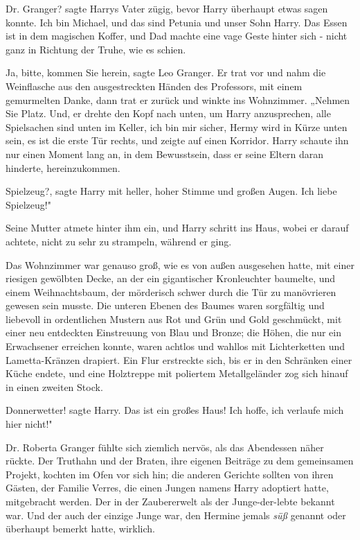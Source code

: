 \glqq Dr. Granger?\grqq{} sagte Harrys Vater zügig, bevor Harry überhaupt etwas
sagen konnte. \glqq Ich bin Michael, und das sind Petunia und unser Sohn Harry.
Das Essen ist in dem magischen Koffer\grqq{}, und Dad machte eine vage Geste
hinter sich - nicht ganz in Richtung der Truhe, wie es schien.

\glqq Ja, bitte, kommen Sie herein\grqq{}, sagte Leo Granger. Er trat vor und
nahm die Weinflasche aus den ausgestreckten Händen des Professors, mit einem
gemurmelten \glqq Danke\grqq{}, dann trat er zurück und winkte ins Wohnzimmer.
„Nehmen Sie Platz. Und\grqq{}, er drehte den Kopf nach unten, um Harry
anzusprechen, \glqq alle Spielsachen sind unten im Keller, ich bin mir sicher,
Hermy wird in Kürze unten sein, es ist die erste Tür rechts\grqq{}, und zeigte
auf einen Korridor. Harry schaute ihn nur einen Moment lang an, in dem
Bewusstsein, dass er seine Eltern daran hinderte, hereinzukommen.

\glqq Spielzeug?\grqq{}, sagte Harry mit heller, hoher Stimme und großen Augen.
\glqq Ich liebe Spielzeug!"

Seine Mutter atmete hinter ihm ein, und Harry schritt ins Haus, wobei er darauf
achtete, nicht zu sehr zu strampeln, während er ging.

Das Wohnzimmer war genauso groß, wie es von außen ausgesehen hatte, mit einer
riesigen gewölbten Decke, an der ein gigantischer Kronleuchter baumelte, und
einem Weihnachtsbaum, der mörderisch schwer durch die Tür zu manövrieren gewesen
sein musste. Die unteren Ebenen des Baumes waren sorgfältig und liebevoll in
ordentlichen Mustern aus Rot und Grün und Gold geschmückt, mit einer neu
entdeckten Einstreuung von Blau und Bronze; die Höhen, die nur ein Erwachsener
erreichen konnte, waren achtlos und wahllos mit Lichterketten und
Lametta-Kränzen drapiert. Ein Flur erstreckte sich, bis er in den Schränken
einer Küche endete, und eine Holztreppe mit poliertem Metallgeländer zog sich
hinauf in einen zweiten Stock.

\glqq Donnerwetter!\grqq{} sagte Harry. \glqq Das ist ein großes Haus! Ich
hoffe, ich verlaufe mich hier nicht!"

Dr. Roberta Granger fühlte sich ziemlich nervös, als das Abendessen näher
rückte. Der Truthahn und der Braten, ihre eigenen Beiträge zu dem gemeinsamen
Projekt, kochten im Ofen vor sich hin; die anderen Gerichte sollten von ihren
Gästen, der Familie Verres, die einen Jungen namens Harry adoptiert hatte,
mitgebracht werden. Der in der Zaubererwelt als der Junge-der-lebte bekannt war.
Und der auch der einzige Junge war, den Hermine jemals \glqq \emph{süß}\grqq{}
genannt oder überhaupt bemerkt hatte, wirklich.

